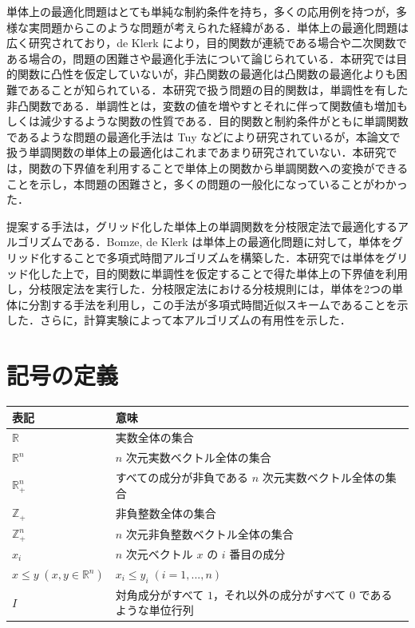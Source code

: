 \documentclass[a4paper,11pt]{jreport}
\begin{document}
単体上の最適化問題はとても単純な制約条件を持ち，多くの応用例を持つが，多様な実問題からこのような問題が考えられた経緯がある．単体上の最適化問題は広く研究されており，de Klerk \cite{deklerk_survey} により，目的関数が連続である場合や二次関数である場合の，問題の困難さや最適化手法について論じられている．本研究では目的関数に凸性を仮定していないが，非凸関数の最適化は凸関数の最適化よりも困難であることが知られている．本研究で扱う問題の目的関数は，単調性を有した非凸関数である．単調性とは，変数の値を増やすとそれに伴って関数値も増加もしくは減少するような関数の性質である．目的関数と制約条件がともに単調関数であるような問題の最適化手法は Tuy \cite{tuy} などにより研究されているが，本論文で扱う単調関数の単体上の最適化はこれまであまり研究されていない．本研究では，関数の下界値を利用することで単体上の関数から単調関数への変換ができることを示し，本問題の困難さと，多くの問題の一般化になっていることがわかった．\par
提案する手法は，グリッド化した単体上の単調関数を分枝限定法で最適化するアルゴリズムである．Bomze, de Klerk \cite{bomze} は単体上の最適化問題に対して，単体をグリッド化することで多項式時間アルゴリズムを構築した．本研究では単体をグリッド化した上で，目的関数に単調性を仮定することで得た単体上の下界値を利用し，分枝限定法を実行した．分枝限定法における分枝規則には，単体を2つの単体に分割する手法を利用し，この手法が多項式時間近似スキームであることを示した．さらに，計算実験によって本アルゴリズムの有用性を示した．

\section{記号の定義}

\begin{table}[htb]
\begin{tabular}{ll}
表記 & 意味 \\ \hline
$ \mathbb{R} $ & 実数全体の集合 \\
$ \mathbb{R}^n $ & $ n $ 次元実数ベクトル全体の集合 \\
$ \mathbb{R}_+^n $ & すべての成分が非負である $ n $ 次元実数ベクトル全体の集合 \\
$ \mathbb{Z}_+ $ & 非負整数全体の集合 \\
$ \mathbb{Z}_+^n $ & $ n $ 次元非負整数ベクトル全体の集合 \\
$ x_i $ & $ n $ 次元ベクトル $ x $ の $ i $ 番目の成分 \\
$ x \leq y \; (x, y \in \mathbb{R}^n) $ & $ x_i \leq y_i \; (i = 1, ..., n) $ \\
$ I $ & 対角成分がすべて $ 1 $，それ以外の成分がすべて $ 0 $ であるような単位行列
\end{tabular}
\end{table}
\end{document}
